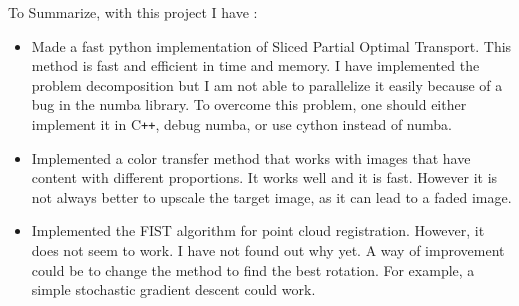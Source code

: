 \documentclass[a4paper,12pt]{article}
\begin{document}
\bigskip


To Summarize, with this project I have :
\begin{itemize}
\item Made a fast python implementation of Sliced Partial Optimal Transport. This method is fast and efficient in time and memory. I have implemented the problem decomposition but I am not able to parallelize it easily because of a bug in the numba library. To overcome this problem, one should either implement it in C\texttt{++}, debug numba, or use cython instead of numba.
\item Implemented a color transfer method that works with images that have content with different proportions. It works well and it is fast. However it is not always better to upscale the target image, as it can lead to a faded image.
\item Implemented the FIST algorithm for point cloud registration. However, it does not seem to work. I have not found out why yet. A way of improvement could be to change the method to find the best rotation. For example, a simple stochastic gradient descent could work.
\end{itemize}






\end{document}
